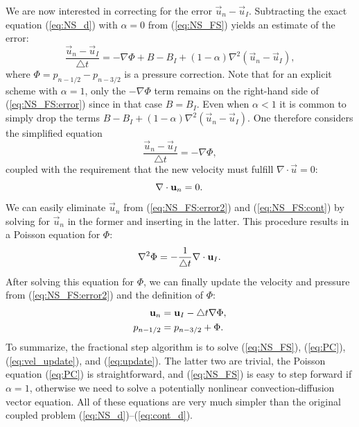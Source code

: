 We are now interested in correcting for the error $\vec{u}_n-\vec{u}_I$.
Subtracting the exact equation (\ref{eq:NS_d}) with
$\alpha = 0$ from
(\ref{eq:NS_FS}) yields an estimate of the error:
\begin{equation}
\label{eq:NS_FS:error}
\frac{{\vec{u}}_{n}-\vec{u}_{I}}{\triangle t} = 
-\nabla\Phi + B - B_I + (1-\alpha )\nabla^2(\vec{u}_n-\vec{u}_I),
\end{equation}
where $\Phi = p_{n-1/2} - p_{n-3/2} $ is a pressure correction.
Note that for an explicit scheme with $\alpha = 1$, only the
$-\nabla\Phi$ term remains on the right-hand side of (\ref{eq:NS_FS:error})
since in that case $B=B_I$. Even when $\alpha < 1$ it is common to simply drop
the terms $B - B_I + (1-\alpha)\nabla^2(\vec{u}_n-\vec{u}_I)$.
One therefore considers the simplified equation
\begin{equation}
\label{eq:NS_FS:error2}
\frac{{\vec{u}}_{n}-\vec{u}_{I}}{\triangle t} = 
-\nabla\Phi,
\end{equation}
coupled with the requirement that the new velocity must fulfill
$\nabla\cdot\vec{u}=0$:
\begin{equation}
 \label{eq:NS_FS:cont} \nabla \cdot \vec{u}_{n} =0 . \thinspace
\end{equation}
We can easily eliminate $\vec{u}_{n}$ from (\ref{eq:NS_FS:error2})
and (\ref{eq:NS_FS:cont}) by solving for $\vec{u}_{n}$ in the former
and inserting in the latter. This procedure results in a 
Poisson equation for $\Phi$:
\begin{equation}
 \label{eq:PC} \nabla^2 \Phi = -\frac{1}{\triangle t} \nabla \cdot {\vec{u}}_{I} . \thinspace
\end{equation}
After solving this equation for $\Phi$, we can
finally update the velocity and pressure from (\ref{eq:NS_FS:error2})
and the definition of $\Phi$:
\begin{align}
 \label{eq:vel_update} \vec{u}_{n} &= {\vec{u}}_{I} - \triangle t \nabla \Phi, \\
  p_{n-1/2} &= p_{n-3/2} + \Phi . \thinspace
\label{eq:update}
\end{align}
To summarize, the fractional step algorithm is to solve
(\ref{eq:NS_FS}), (\ref{eq:PC}), (\ref{eq:vel_update}), and
(\ref{eq:update}). The latter two are trivial, the Poisson
equation (\ref{eq:PC}) is straightforward, and (\ref{eq:NS_FS})
is easy to step forward if $\alpha=1$, otherwise we need to solve
a potentially nonlinear convection-diffusion vector equation.
All of these equations are very much simpler than the
original coupled problem (\ref{eq:NS_d})--(\ref{eq:cont_d}).

